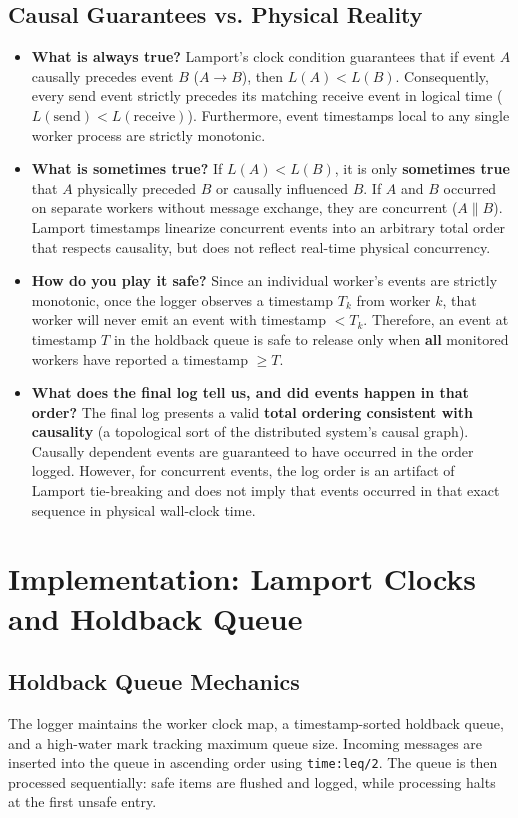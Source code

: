 \documentclass[a4paper, 11pt]{article}
\begin{document}
\subsection{Causal Guarantees vs. Physical Reality}
\begin{itemize}
    \item \textbf{What is always true?}
    Lamport's clock condition guarantees that if event $A$ causally precedes event $B$ ($A \rightarrow B$), then $L(A) < L(B)$. Consequently, every send event strictly precedes its matching receive event in logical time ($L(\text{send}) < L(\text{receive})$). Furthermore, event timestamps local to any single worker process are strictly monotonic.
    \item \textbf{What is sometimes true?}
    If $L(A) < L(B)$, it is only \textbf{sometimes true} that $A$ physically preceded $B$ or causally influenced $B$. If $A$ and $B$ occurred on separate workers without message exchange, they are concurrent ($A \parallel B$). Lamport timestamps linearize concurrent events into an arbitrary total order that respects causality, but does not reflect real-time physical concurrency.
    \item \textbf{How do you play it safe?}
    Since an individual worker's events are strictly monotonic, once the logger observes a timestamp $T_k$ from worker $k$, that worker will never emit an event with timestamp $< T_k$. Therefore, an event at timestamp $T$ in the holdback queue is safe to release only when \textbf{all} monitored workers have reported a timestamp $\ge T$.
    \item \textbf{What does the final log tell us, and did events happen in that order?}
    The final log presents a valid \textbf{total ordering consistent with causality} (a topological sort of the distributed system's causal graph). Causally dependent events are guaranteed to have occurred in the order logged. However, for concurrent events, the log order is an artifact of Lamport tie-breaking and does not imply that events occurred in that exact sequence in physical wall-clock time.
\end{itemize}

\section{Implementation: Lamport Clocks and Holdback Queue}

\subsection{Holdback Queue Mechanics}
The logger maintains the worker clock map, a timestamp-sorted holdback queue, and a high-water mark tracking maximum queue size. Incoming messages are inserted into the queue in ascending order using \texttt{time:leq/2}. The queue is then processed sequentially: safe items are flushed and logged, while processing halts at the first unsafe entry.
\end{document}
